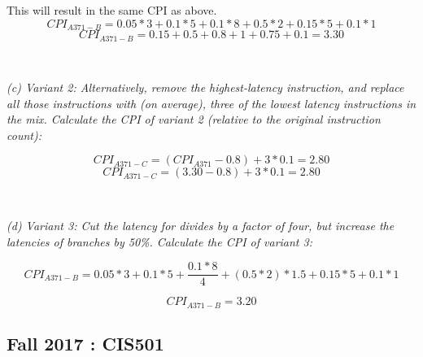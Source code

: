 \documentclass[12pt]{article}
\newenvironment{QandA}{\begin{enumerate}[label=\bfseries\arabic*.]\bfseries}
                      {\end{enumerate}}
\newenvironment{answered}{\par\quad\normalfont}{}
\begin{document}
\begin{QandA}
\begin{answered}
    This will result in the same CPI as above.
    \begin{equation*}
        CPI_{A371-B} = 0.05 * 3 + 0.1 * 5 + 0.1 * 8 + 0.5 * 2 + 0.15 * 5 + 0.1 * 1
    \end{equation*}
    \begin{equation*}
        CPI_{A371-B} = 0.15 + 0.5 + 0.8 + 1 + 0.75 + 0.1 = 3.30
    \end{equation*}
    
    \ 
    
    \textit{(c) Variant 2: Alternatively, remove the highest-latency instruction, and replace all those instructions with (on average), three of the lowest latency instructions in the mix. Calculate the CPI of variant 2 (relative to the original instruction count):}
    
    \begin{equation*}
        CPI_{A371-C} = (CPI_{A371} - 0.8) + 3 * 0.1 = 2.80
    \end{equation*}
    \begin{equation*}
        CPI_{A371-C} = (3.30 - 0.8) + 3 * 0.1 = 2.80
    \end{equation*}
    
    \ 
    
    \textit{(d) Variant 3: Cut the latency for divides by a factor of four, but increase the latencies of branches by 50\%. Calculate the CPI of variant 3:}
    
    \begin{equation*}
        CPI_{A371-B} = 0.05 * 3 + 0.1 * 5 + \frac{0.1 * 8}{4} + (0.5 * 2)*1.5 + 0.15 * 5 + 0.1 * 1
    \end{equation*}
    
    \begin{equation*}
        CPI_{A371-B} = 3.20
    \end{equation*}
    
    \end{answered}

\end{QandA}

\subsection{Fall 2017 : CIS501}
\end{document}
